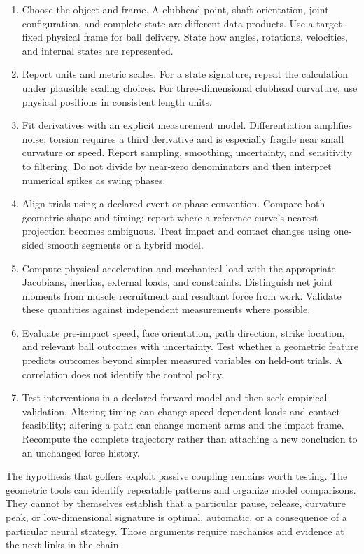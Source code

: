 \begin{enumerate}
\item Choose the object and frame. A clubhead point, shaft orientation,
   joint configuration, and complete state are different data products.
   Use a target-fixed physical frame for ball delivery. State how angles,
   rotations, velocities, and internal states are represented.
\item Report units and metric scales. For a state signature, repeat the
   calculation under plausible scaling choices. For three-dimensional
   clubhead curvature, use physical positions in consistent length units.
\item Fit derivatives with an explicit measurement model. Differentiation
   amplifies noise; torsion requires a third derivative and is especially
   fragile near small curvature or speed. Report sampling, smoothing,
   uncertainty, and sensitivity to filtering. Do not divide by near-zero
   denominators and then interpret numerical spikes as swing phases.
\item Align trials using a declared event or phase convention. Compare both
   geometric shape and timing; report where a reference curve's nearest
   projection becomes ambiguous. Treat impact and contact changes using
   one-sided smooth segments or a hybrid model.
\item Compute physical acceleration and mechanical load with the appropriate
   Jacobians, inertias, external loads, and constraints. Distinguish net
   joint moments from muscle recruitment and resultant force from work.
   Validate these quantities against independent measurements where possible.
\item Evaluate pre-impact speed, face orientation, path direction, strike
   location, and relevant ball outcomes with uncertainty. Test whether a
   geometric feature predicts outcomes beyond simpler measured variables
   on held-out trials. A correlation does not identify the control policy.
\item Test interventions in a declared forward model and then seek empirical
   validation. Altering timing can change speed-dependent loads and contact
   feasibility; altering a path can change moment arms and the impact frame.
   Recompute the complete trajectory rather than attaching a new conclusion
   to an unchanged force history.
\end{enumerate}

The hypothesis that golfers exploit passive coupling remains worth testing.
The geometric tools can identify repeatable patterns and organize model
comparisons. They cannot by themselves establish that a particular pause,
release, curvature peak, or low-dimensional signature is optimal, automatic,
or a consequence of a particular neural strategy. Those arguments require
mechanics and evidence at the next links in the chain.

